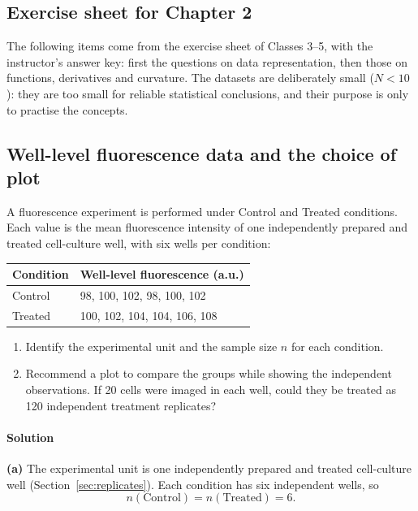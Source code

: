 \subsection*{Exercise sheet for Chapter 2}

The following items come from the exercise sheet of Classes 3--5, with the instructor's answer key: first the questions on data representation, then those on functions, derivatives and curvature. The datasets are deliberately small ($N < 10$): they are too small for reliable statistical conclusions, and their purpose is only to practise the concepts.

\subsection{Well-level fluorescence data and the choice of plot}
\label{ex:wells}

A fluorescence experiment is performed under Control and Treated conditions. Each value is the mean fluorescence intensity of one independently prepared and treated cell-culture well, with six wells per condition:
\begin{center}
\begin{tabular}{ll}
\toprule
Condition & Well-level fluorescence (a.u.) \\
\midrule
Control & 98, 100, 102, 98, 100, 102 \\
Treated & 100, 102, 104, 104, 106, 108 \\
\bottomrule
\end{tabular}
\end{center}
\begin{enumerate}[label=(\alph*)]
    \item Identify the experimental unit and the sample size $n$ for each condition.
    \item Recommend a plot to compare the groups while showing the independent observations. If 20 cells were imaged in each well, could they be treated as 120 independent treatment replicates?
\end{enumerate}

\paragraph{Solution} \textbf{(a)} The experimental unit is one independently prepared and treated cell-culture well (Section~\ref{sec:replicates}). Each condition has six independent wells, so
\begin{equation*}
n(\text{Control}) = n(\text{Treated}) = 6.
\end{equation*}

